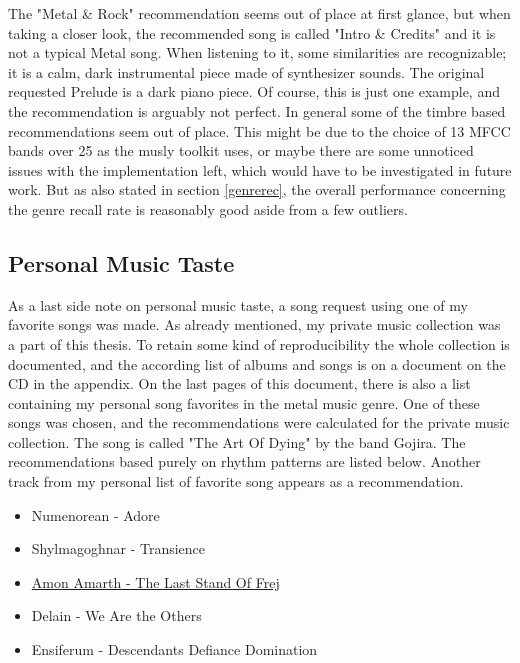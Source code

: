 \noindent The "Metal \& Rock" recommendation seems out of place at first glance, but when taking a closer look, the recommended song is called "Intro \& Credits" and it is not a typical Metal song. When listening to it, some similarities are recognizable; it is a calm, dark instrumental piece made of synthesizer sounds. The original requested Prelude is a dark piano piece. Of course, this is just one example, and the recommendation is arguably not perfect. In general some of the timbre based recommendations seem out of place. This might be due to the choice of 13 MFCC bands over 25 as the musly toolkit uses, or maybe there are some unnoticed issues with the implementation left, which would have to be investigated in future work. But as also stated in section \ref{genrerec}, the overall performance concerning the genre recall rate is reasonably good aside from a few outliers.

\subsection{Personal Music Taste}\label{personal}

As a last side note on personal music taste, a song request using one of my favorite songs was made. As already mentioned, my private music collection was a part of this thesis. To retain some kind of reproducibility the whole collection is documented, and the according list of albums and songs is on a document on the CD in the appendix. On the last pages of this document, there is also a list containing my personal song favorites in the metal music genre. One of these songs was chosen, and the recommendations were calculated for the private music collection. The song is called "The Art Of Dying" by the band Gojira. The recommendations based purely on rhythm patterns are listed below. Another track from my personal list of favorite song appears as a recommendation. 

\begin{itemize}
	\setlength\itemsep{-0.5em}
	\item Numenorean - Adore
	\item Shylmagoghnar - Transience
	\item \underline{Amon Amarth - The Last Stand Of Frej}
	\item Delain - We Are the Others
	\item Ensiferum - Descendants Defiance Domination
\end{itemize}

